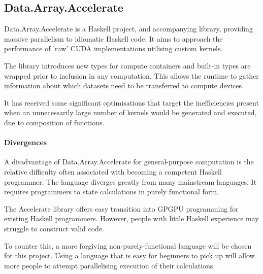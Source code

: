 \subsection{Data.Array.Accelerate}

Data.Array.Accelerate is a Haskell project\cite{daa}, and accompanying library\cite{daalib}, providing massive parallelism to idiomatic Haskell code. It aims to approach the performance of 'raw' \ac{CUDA} implementations utilising custom kernels.

The library introduces new types for compute containers and built-in types are wrapped prior to inclusion in any computation. This allows the runtime to gather information about which datasets need to be transferred to compute devices.

It has received some significant optimisations\cite{daaopt} that target the inefficiencies present when an unnecessarily large number of kernels would be generated and executed, due to composition of functions.

\paragraph{Divergences}
A disadvantage of Data.Array.Accelerate for general-purpose computation is the relative difficulty often associated with becoming a competent Haskell programmer. The language diverges greatly from many mainstream languages.  It requires programmers to state calculations in purely functional form.

The Accelerate library offers easy transition into \ac{GPGPU} programming for existing Haskell programmers. However, people with little Haskell experience may struggle to construct valid code.

 To counter this, a more forgiving non-purely-functional language will be chosen for this project. Using a language that is easy for beginners to pick up will allow more people to attempt parallelising execution of their calculations.
